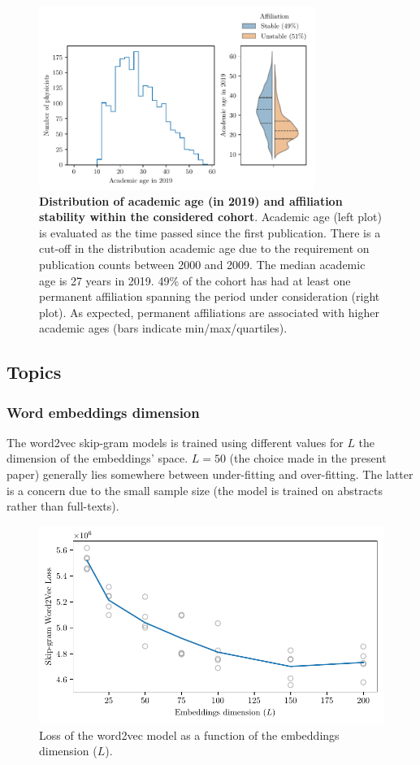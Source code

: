 \documentclass{article}
\begin{document}
\begin{figure}[H]
    \centering
    \includegraphics[width=0.8\textwidth]{Fig11.pdf}
    \caption{\textbf{Distribution of academic age (in 2019) and affiliation stability within the considered cohort}.  Academic age (left plot) is evaluated as the time passed since the first publication. There is a cut-off in the distribution academic age due to the requirement on publication counts between 2000 and 2009. The median academic age is 27 years in 2019. 49\% of the cohort has had at least one permanent affiliation spanning the period under consideration (right plot). As expected, permanent affiliations are associated with higher academic ages (bars indicate min/max/quartiles). }
    \label{fig:sample_characteristics}
\end{figure}

\subsection{\label{appendix:topics}Topics}

\subsubsection{\label{appendix:word2vec}Word embeddings dimension}

The word2vec skip-gram models is trained using different values for $L$ the dimension of the embeddings' space. $L=50$ (the choice made in the present paper) generally lies somewhere between under-fitting and over-fitting. The latter is a concern due to the small sample size (the model is trained on abstracts rather than full-texts).

\begin{figure}[H]
    \centering
    \includegraphics[width=0.8\linewidth]{Fig12}
    \caption{Loss of the word2vec model as a function of the embeddings dimension ($L$). }
    \label{fig:word2vec}
\end{figure} 
\end{document}
